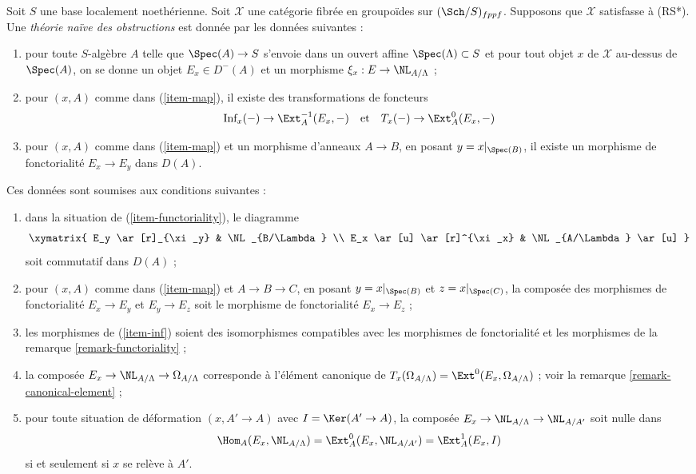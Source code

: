 \begin{definition}
\label{definition-naive-obstruction-theory}
Soit $S$ une base localement noethérienne. Soit $\mathcal{X}$ une catégorie
fibrée en groupoïdes sur $(\Sch/S)_{fppf}$. Supposons que $\mathcal{X}$
satisfasse à (RS*). Une {\it théorie naïve des obstructions} est donnée par
les données suivantes :
\begin{enumerate}
\item
\label{item-map}
pour toute $S$-algèbre $A$ telle que $\Spec(A) \to S$ s'envoie dans un ouvert
affine $\Spec(\Lambda) \subset S$ et pour tout objet $x$ de $\mathcal{X}$
au-dessus de $\Spec(A)$, on se donne un objet $E_x \in D^-(A)$ et un morphisme
$\xi_x : E \to \NL_{A/\Lambda}$ ;
\item
\label{item-inf}
pour $(x, A)$ comme dans (\ref{item-map}), il existe des transformations de
foncteurs
$$
\text{Inf}_x( - ) \to \Ext^{-1}_A(E_x, -)
\quad\text{et}\quad
T_x(-) \to \Ext^0_A(E_x, -)
$$
\item
\label{item-functoriality}
pour $(x, A)$ comme dans (\ref{item-map}) et un morphisme d'anneaux
$A \to B$, en posant $y = x|_{\Spec(B)}$, il existe un morphisme de
fonctorialité $E_x \to E_y$ dans $D(A)$.
\end{enumerate}
Ces données sont soumises aux conditions suivantes :
\begin{enumerate}
\item[(i)]
dans la situation de (\ref{item-functoriality}), le diagramme
$$
\xymatrix{
E_y \ar[r]_{\xi_y} & \NL_{B/\Lambda} \\
E_x \ar[u] \ar[r]^{\xi_x} & \NL_{A/\Lambda} \ar[u]
}
$$
soit commutatif dans $D(A)$ ;
\item[(ii)]
pour $(x, A)$ comme dans (\ref{item-map}) et $A \to B \to C$, en posant
$y = x|_{\Spec(B)}$ et $z = x|_{\Spec(C)}$, la composée des morphismes de
fonctorialité $E_x \to E_y$ et $E_y \to E_z$ soit le morphisme de
fonctorialité $E_x \to E_z$ ;
\item[(iii)]
les morphismes de (\ref{item-inf}) soient des isomorphismes compatibles avec
les morphismes de fonctorialité et les morphismes de la remarque
\ref{remark-functoriality} ;
\item[(iv)]
la composée $E_x \to \NL_{A/\Lambda} \to \Omega_{A/\Lambda}$ corresponde à
l'élément canonique de
$T_x(\Omega_{A/\Lambda}) = \Ext^0(E_x, \Omega_{A/\Lambda})$ ; voir la remarque
\ref{remark-canonical-element} ;
\item[(v)]
pour toute situation de déformation $(x, A' \to A)$ avec
$I = \Ker(A' \to A)$, la composée
$E_x \to \NL_{A/\Lambda} \to \NL_{A/A'}$ soit nulle dans
$$
\Hom_A(E_x, \NL_{A/\Lambda}) = \Ext^0_A(E_x, \NL_{A/A'}) =
\Ext^1_A(E_x, I)
$$
si et seulement si $x$ se relève à $A'$.
\end{enumerate}
\end{definition}


